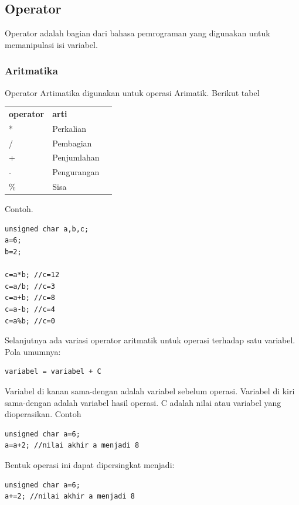 \documentclass[12pt,]{article}
\begin{document}
	\subsection{Operator}
	Operator adalah bagian dari bahasa pemrograman yang digunakan untuk memanipulasi isi variabel.
	
	\subsubsection{Aritmatika}
	Operator Artimatika digunakan untuk operasi Arimatik.
	Berikut tabel
	
	\begin{table}[H]
		\begin{tabular}{|l|l|l}
			\cline{1-2}
			\textbf{operator} & \textbf{arti} \\ \cline{1-2}
			* & Perkalian \\ \cline{1-2}
			/ & Pembagian \\ \cline{1-2}
			+ & Penjumlahan \\ \cline{1-2}
			- & Pengurangan \\ \cline{1-2}
			\% & Sisa \\ \cline{1-2}
		\end{tabular}
	\end{table}

	Contoh.
	\begin{verbatim}
unsigned char a,b,c;
a=6;
b=2;

c=a*b; //c=12
c=a/b; //c=3
c=a+b; //c=8
c=a-b; //c=4
c=a%b; //c=0
	\end{verbatim}
	
	Selanjutnya ada variasi operator aritmatik untuk operasi terhadap satu variabel.
	Pola umumnya:
	\begin{verbatim}
variabel = variabel + C
	\end{verbatim}

	Variabel di kanan sama-dengan adalah variabel sebelum operasi.
	Variabel di kiri sama-dengan adalah variabel hasil operasi.
	C adalah nilai atau variabel yang dioperasikan.
	Contoh
	\begin{verbatim}
unsigned char a=6;
a=a+2; //nilai akhir a menjadi 8
	\end{verbatim}
	
	Bentuk operasi ini dapat dipersingkat menjadi:
	\begin{verbatim}
unsigned char a=6;
a+=2; //nilai akhir a menjadi 8
	\end{verbatim}
	
\end{document}
